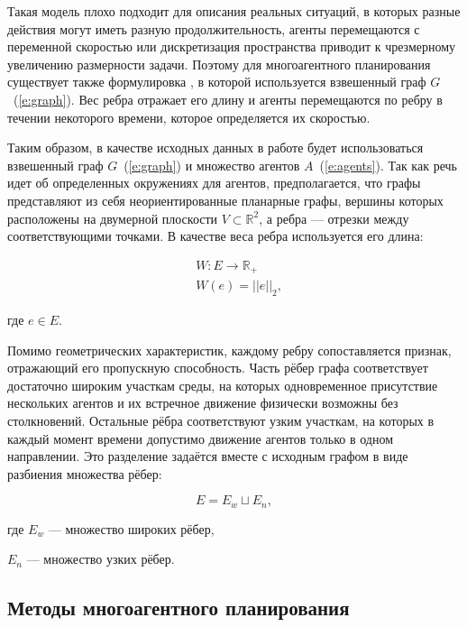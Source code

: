 Такая модель плохо подходит для описания реальных ситуаций, в которых разные действия могут иметь 
разную продолжительность, агенты перемещаются с переменной скоростью или дискретизация пространства 
приводит к чрезмерному увеличению размерности задачи.
Поэтому для многоагентного планирования существует также формулировка \cite{ccbs}, в которой 
используется взвешенный граф $G$~(\ref{e:graph}). Вес ребра отражает его длину и агенты перемещаются по 
ребру в течении некоторого времени, которое определяется их скоростью.

Таким образом, в качестве исходных данных в работе будет использоваться взвешенный граф $G$~(\ref{e:graph}) 
и множество агентов $A$~(\ref{e:agents}). Так как речь идет об определенных окружениях для агентов,
предполагается, что графы представляют из себя неориентированные планарные графы, вершины которых 
расположены на двумерной плоскости $V \subset \mathbb{R}^2$, а ребра --- отрезки между 
соответствующими точками. В качестве веса ребра используется его длина:

\begin{equation}
\begin{split}
    &W : E \rightarrow \mathbb{R}_{+} \\
    &W(e) = ||e||_2,
\end{split}
\end{equation}

где $e \in E$.

Помимо геометрических характеристик, каждому ребру сопоставляется признак, отражающий его
пропускную способность. Часть рёбер графа соответствует достаточно широким участкам среды, на
которых одновременное присутствие нескольких агентов и их встречное движение физически возможны
без столкновений. Остальные рёбра соответствуют узким участкам, на которых в каждый момент времени
допустимо движение агентов только в одном направлении. Это разделение задаётся вместе с исходным
графом в виде разбиения множества рёбер:

\begin{equation}
    E = E_{w} \sqcup E_{n},
\label{e:edges-split}
\end{equation}

где $E_{w}$ --- множество широких рёбер,\par
$E_{n}$ --- множество узких рёбер.

\subsection{Методы многоагентного планирования}

